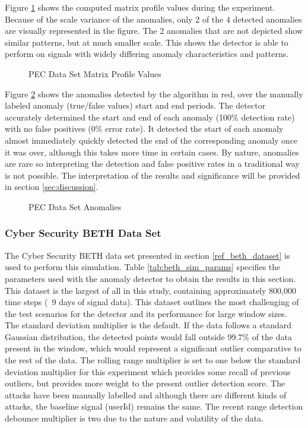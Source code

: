 Figure \ref{fig:pec_mp_hist} shows the computed matrix profile values during the experiment. Because of the scale variance of the anomalies, only 2 of the 4 detected anomalies are visually represented in the figure. The 2 anomalies that are not depicted show similar patterns, but at much smaller scale. This shows the detector is able to perform on signals with widely differing anomaly characteristics and patterns.

\begin{figure}[H]
    
    \caption{PEC Data Set Matrix Profile Values}
    \label{fig:pec_mp_hist}
\end{figure}

Figure \ref{fig:pec_outliers} shows the anomalies detected by the algorithm in red, over the manually labeled anomaly (true/false values) start and end periods. The detector accurately determined the start and end of each anomaly (100\% detection rate) with no false positives (0\% error rate). It detected the start of each anomaly almost immediately quickly detected the end of the corresponding anomaly once it was over, although this takes more time in certain cases. By nature, anomalies are rare so interpreting the detection and false positive rates in a traditional way is not possible. The interpretation of the results and significance will be provided in section \ref{sec:discussion}.
 
\begin{figure}[H]
    
    \caption{PEC Data Set Anomalies}
    \label{fig:pec_outliers}
\end{figure}

\subsubsection{Cyber Security BETH Data Set}
\label{ref_results_beth_sim}
The Cyber Security BETH data set presented in section \ref{ref_beth_dataset} is used to perform this simulation. Table \ref{tab:beth_sim_params} specifies the parameters used with the anomaly detector to obtain the results in this section. This dataset is the largest of all in this study, containing approximately 800,000 time steps (~9 days of signal data). This dataset outlines the most challenging of the test scenarios for the detector and its performance for large window sizes. The standard deviation multiplier is the default. If the data follows a standard Gaussian distribution, the detected points would fall outside 99.7\% of the data present in the window, which would represent a significant outlier comparative to the rest of the data. The rolling range multiplier is set to one below the standard deviation multiplier for this experiment which provides some recall of previous outliers, but provides more weight to the present outlier detection score. The attacks have been manually labelled and although there are different kinds of attacks, the baseline signal (userId) remains the same. The recent range detection debounce multiplier is two due to the nature and volatility of the data.

